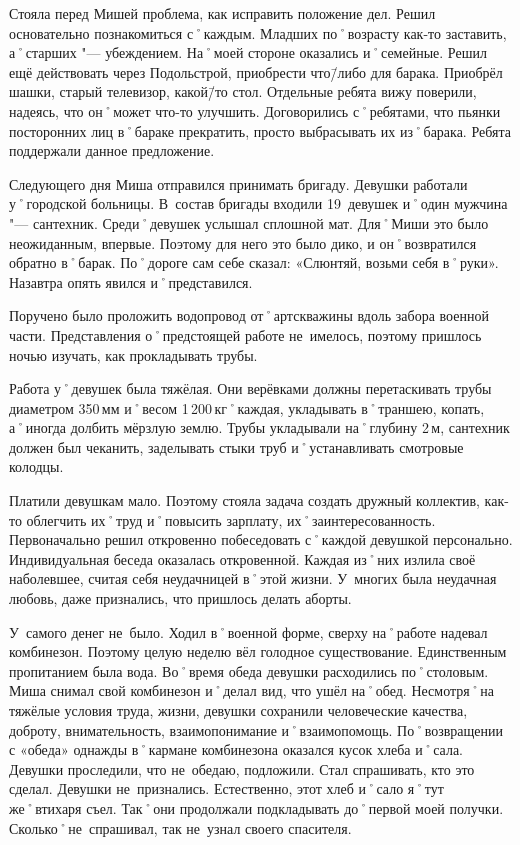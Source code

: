 Стояла перед Мишей проблема, как исправить положение дел. Решил основательно познакомиться с˚каждым. Младших по˚возрасту как-то заставить, а˚старших "--- убеждением. На˚моей стороне оказались и˚семейные. Решил ещё действовать через Подольстрой, приобрести что\=/либо для барака. Приобрёл шашки, старый телевизор, какой\=/то стол. Отдельные ребята вижу поверили, надеясь, что он˚может что-то улучшить. Договорились с˚ребятами, что пьянки посторонних лиц в˚бараке прекратить, просто выбрасывать их из˚барака. Ребята поддержали данное предложение. 

Следующего дня Миша отправился принимать бригаду. Девушки работали у˚городской больницы. В~состав бригады входили 19~девушек и˚один мужчина "--- сантехник. Среди˚девушек услышал сплошной мат. Для˚Миши это было неожиданным, впервые. Поэтому для него это было дико, и он˚возвратился обратно в˚барак. По˚дороге сам себе сказал: «Слюнтяй, возьми себя в˚руки». Назавтра опять явился и˚представился. 

Поручено было проложить водопровод от˚артскважины вдоль забора военной части. Представления о˚предстоящей работе не~имелось, поэтому пришлось ночью изучать, как прокладывать трубы.

Работа у˚девушек была тяжёлая. Они верёвками должны перетаскивать трубы диаметром 350\,мм и˚весом 1\,200\,кг˚каждая, укладывать в˚траншею, копать, а˚иногда долбить мёрзлую землю. Трубы укладывали на˚глубину 2\,м, сантехник должен был чеканить, заделывать стыки труб и˚устанавливать смотровые колодцы.

Платили девушкам мало. Поэтому стояла задача создать дружный коллектив, как-то облегчить их˚труд и˚повысить зарплату, их˚заинтересованность. Первоначально решил откровенно побеседовать с˚каждой девушкой персонально. Индивидуальная беседа оказалась откровенной. Каждая из˚них излила своё наболевшее, считая себя неудачницей в˚этой жизни. У~многих была неудачная любовь, даже признались, что пришлось делать аборты.

У~самого денег не~было. Ходил в˚военной форме, сверху на˚работе надевал комбинезон. Поэтому целую неделю вёл голодное существование. Единственным пропитанием была вода. Во˚время обеда девушки расходились по˚столовым. Миша снимал свой комбинезон и˚делал вид, что ушёл на˚обед. Несмотря˚на тяжёлые условия труда, жизни, девушки сохранили человеческие качества, доброту, внимательность, взаимопонимание и˚взаимопомощь. По˚возвращении с «обеда» однажды в˚кармане комбинезона оказался кусок хлеба и˚сала. Девушки проследили, что не~обедаю, подложили. Стал спрашивать, кто это сделал. Девушки не~признались. Естественно, этот хлеб и˚сало я˚тут же˚втихаря съел. Так˚они продолжали подкладывать до˚первой моей получки. Сколько˚не~спрашивал, так не~узнал своего спасителя.

